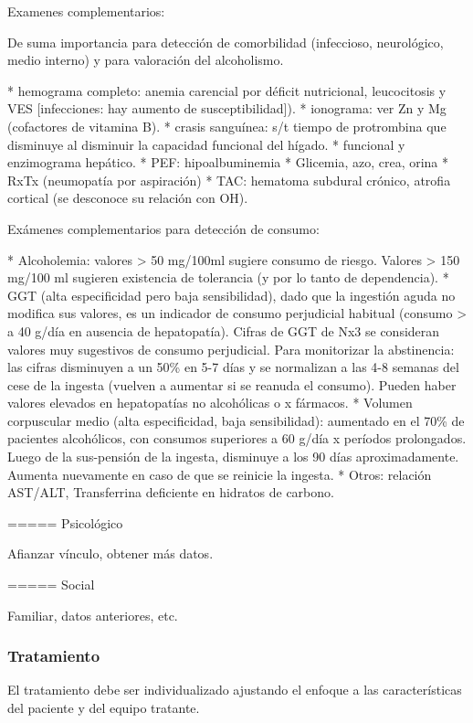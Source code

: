 \documentclass[encares.tex]{subfiles}
\begin{document}
Examenes complementarios:

De suma importancia para detección de comorbilidad (infeccioso, neurológico, medio interno) y para valoración del alcoholismo.

* hemograma completo: anemia carencial por déficit nutricional, leucocitosis y VES [infecciones: hay aumento de susceptibilidad]).
* ionograma: ver Zn y Mg (cofactores de vitamina B).
* crasis sanguínea: s/t tiempo de protrombina que disminuye al disminuir la capacidad funcional del hígado.
* funcional y enzimograma hepático.
* PEF: hipoalbuminemia
* Glicemia, azo, crea, orina
* RxTx (neumopatía por aspiración)
* TAC: hematoma subdural crónico, atrofia cortical (se desconoce su relación con OH).

Exámenes complementarios para detección de consumo:

* Alcoholemia: valores > 50 mg/100ml sugiere consumo de riesgo. Valores > 150 mg/100 ml sugieren existencia de tolerancia (y por lo tanto de dependencia).
* GGT (alta especificidad pero baja sensibilidad), dado que la ingestión aguda no modifica sus valores, es un indicador de consumo perjudicial habitual (consumo > a 40 g/día en ausencia de hepatopatía). Cifras de GGT de Nx3 se consideran valores muy sugestivos de consumo perjudicial. Para monitorizar la abstinencia: las cifras disminuyen a un 50\% en 5-7 días y se normalizan a las 4-8 semanas del cese de la ingesta (vuelven a aumentar si se reanuda el consumo). Pueden haber valores elevados en hepatopatías no alcohólicas o x fármacos.
* Volumen corpuscular medio (alta especificidad, baja sensibilidad): aumentado en el 70\% de pacientes alcohólicos, con consumos superiores a 60 g/día x períodos prolongados. Luego de la sus-pensión de la ingesta, disminuye a los 90 días aproximadamente. Aumenta nuevamente en caso de que se reinicie la ingesta.
* Otros: relación AST/ALT, Transferrina deficiente en hidratos de carbono.

===== Psicológico

Afianzar vínculo, obtener más datos.

===== Social

Familiar, datos anteriores, etc.

\subsubsection*{Tratamiento}

El tratamiento debe ser individualizado ajustando el enfoque a las características del paciente y del equipo tratante.
\end{document}
